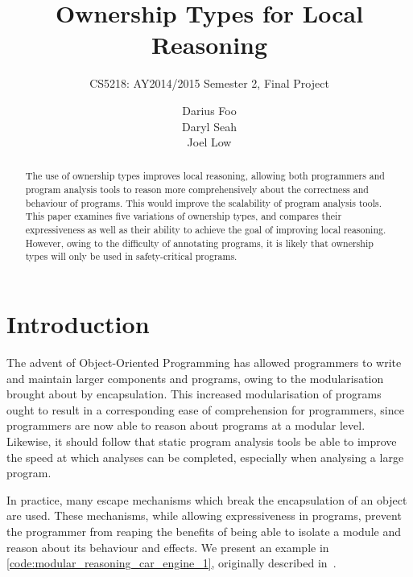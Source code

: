 \documentclass{acm_proc_article-sp}
\begin{document}
\title{Ownership Types for Local Reasoning}
\subtitle{CS5218: AY2014/2015 Semester 2, Final Project}


\author{
\alignauthor
Darius Foo\\
\alignauthor
Daryl Seah\\
\alignauthor
Joel Low\\
}



\maketitle
\begin{abstract}
The use of ownership types improves local reasoning, allowing both programmers
and program analysis tools to reason more comprehensively about the correctness
and behaviour of programs. This would improve the scalability of program
analysis tools. This paper examines five variations of ownership types, and
compares their expressiveness as well as their ability to achieve the goal of
improving local reasoning. However, owing to the difficulty of annotating
programs, it is likely that ownership types will only be used in
safety-critical programs.
\end{abstract}

\section{Introduction}
\label{sec:introduction}

The advent of Object-Oriented Programming has allowed programmers to write and
maintain larger components and programs, owing to the modularisation brought
about by encapsulation. This increased modularisation of programs ought to
result in a corresponding ease of comprehension for programmers, since
programmers are now able to reason about programs at a modular level.
Likewise, it should follow that static program analysis tools be able to
improve the speed at which analyses can be completed, especially when analysing
a large program.

In practice, many escape mechanisms which break the encapsulation of an object
are used. These mechanisms, while allowing expressiveness in programs, prevent
the programmer from reaping the benefits of being able to isolate a module and
reason about its behaviour and effects. We present an example in
\cref{code:modular_reasoning_car_engine_1}, originally
described in~\cite{clarke98ownership}.
\end{document}

